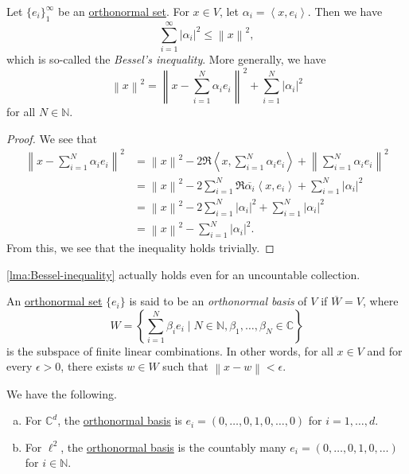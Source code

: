 \begin{lemma}\label{lma:Bessel-inequality}
	Let \(\{e_i\}_1^\infty\) be an \hyperref[def:orthonormal-set]{orthonormal set}. For \(x \in V\), let \(\alpha_i = \left< x,e_i \right>\). Then we have
	\[
		\sum_{i=1}^\infty \left\vert \alpha_i \right\vert^2 \leq \left\lVert x\right\rVert^2,
	\]
	which is so-called the \emph{Bessel's inequality}. More generally, we have
	\[
		\left\lVert x\right\rVert^2 = \left\lVert x - \sum_{i=1}^N \alpha_i e_i\right\rVert ^2 + \sum_{i=1}^N \left\vert \alpha_i \right\vert ^2
	\]
	for all \(N \in \mathbb{N}\).
\end{lemma}
\begin{proof}
	We see that
	\[
		\begin{split}
			\left\lVert x - \sum_{i=1}^N \alpha_ie_i\right\rVert^2
			 & = \left\lVert x\right\rVert^2 - 2\Re \left< x, \sum_{i=1}^N \alpha_i e_i\right> + \left\lVert \sum_{i=1}^N \alpha_i e_i\right\rVert ^2      \\
			 & = \left\lVert x\right\rVert^2 - 2\sum_{i=1}^N \Re \overline{\alpha_i}\left< x,e_i \right> + \sum_{i=1}^N \left\vert \alpha_i \right\vert ^2 \\
			 & = \left\lVert x\right\rVert^2 - 2\sum_{i=1}^N \left\vert \alpha_i \right\vert ^2 + \sum_{i=1}^N \left\vert \alpha_i \right\vert ^2          \\
			 & = \left\lVert x\right\rVert^2 - \sum_{i=1}^N \left\vert \alpha_i \right\vert ^2.
		\end{split}
	\]
	From this, we see that the inequality holds trivially.
\end{proof}
\begin{remark}
	\autoref{lma:Bessel-inequality} actually holds even for an uncountable collection.
\end{remark}

\begin{definition}\label{def:orthonormal-basis}
	An \hyperref[def:orthonormal-set]{orthonormal set} \(\{e_i\}\) is said to be an \emph{orthonormal basis} of \(V\) if \(\overline{W} = V\), where
	\[
		W = \left\{\sum_{i=1}^N \beta_i e_i \mid N \in \mathbb{N}, \beta_1,\dots,\beta_N \in \mathbb{C}\right\}
	\]
	is the subspace of finite linear combinations. In other words, for all \(x \in V\) and for every \(\epsilon > 0\), there exists \(w \in W\) such that \(\left\lVert x - w\right\rVert  < \epsilon \).
\end{definition}

\begin{eg}
	We have the following.
	\begin{enumerate}[(a)]
		\item For \(\mathbb{C}^d\), the \hyperref[def:orthonormal-basis]{orthonormal basis} is \(e_i = (0,\dots,0,1,0,\dots,0)\) for \(i = 1,\dots,d\).
		\item For \(\ell^2\), the \hyperref[def:orthonormal-basis]{orthonormal basis} is the countably many \(e_i = (0,\dots,0,1,0,\dots)\) for \(i \in \mathbb{N}\).
	\end{enumerate}
\end{eg}

